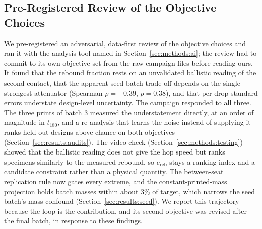 \documentclass[11pt]{article}
\begin{document}
\subsection{Pre-Registered Review of the Objective Choices}
\label{sec:discussion:review}
We
pre-registered an adversarial, data-first review of the objective choices
and ran it with the analysis tool named in Section~\ref{sec:methods:ai}; the
review had to commit to its own objective set from the raw campaign files
before reading ours. It found that the rebound fraction rests on an
unvalidated ballistic reading of the second contact, that the apparent
seed-batch trade-off depends on the single strongest attenuator
(Spearman $\rho = -0.39$, $p = 0.38$), and that per-drop standard errors
understate design-level uncertainty. The campaign responded to all
three. The three prints of batch 3 measured the understatement directly,
at an order of magnitude in $t_{180}$, and a re-analysis that learns the
noise instead of supplying it ranks held-out designs above chance on both
objectives (Section~\ref{sec:results:audits}). The video check
(Section~\ref{sec:methods:testing}) showed that the ballistic reading
does not give the hop speed but ranks specimens similarly to the
measured rebound, so $e_{\mathrm{reb}}$ stays a ranking index and a
candidate constraint rather than a physical quantity. The between-seat
replication rule now gates every extreme, and the constant-printed-mass
projection holds batch masses within about 3\% of target, which narrows
the seed batch's mass confound (Section~\ref{sec:results:seed}). We
report this trajectory because the loop is the contribution, and its
second objective was revised after the final batch, in response to
these findings.
\end{document}
